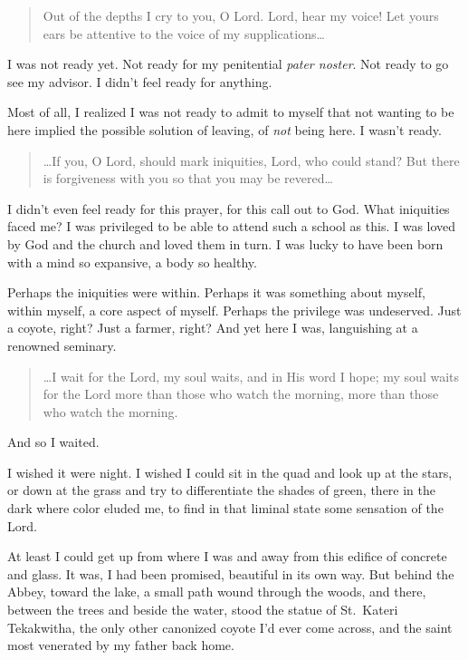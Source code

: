 \begin{quote}
Out of the depths I cry to you, O Lord. Lord, hear my voice! Let yours ears be attentive to the voice of my supplications\ldots{}
\end{quote}

I was not ready yet. Not ready for my penitential \emph{pater noster}. Not ready to go see my advisor. I didn't feel ready for anything.

Most of all, I realized I was not ready to admit to myself that not wanting to be here implied the possible solution of leaving, of \emph{not} being here. I wasn't ready.

\begin{quote}
\ldots If you, O Lord, should mark iniquities, Lord, who could stand? But there is forgiveness with you so that you may be revered\ldots{}
\end{quote}

I didn't even feel ready for this prayer, for this call out to God. What iniquities faced me? I was privileged to be able to attend such a school as this. I was loved by God and the church and loved them in turn. I was lucky to have been born with a mind so expansive, a body so healthy.

Perhaps the iniquities were within. Perhaps it was something about myself, within myself, a core aspect of myself. Perhaps the privilege was undeserved. Just a coyote, right? Just a farmer, right? And yet here I was, languishing at a renowned seminary.

\begin{quote}
\ldots I wait for the Lord, my soul waits, and in His word I hope; my soul waits for the Lord more than those who watch the morning, more than those who watch the morning.
\end{quote}

And so I waited.

I wished it were night. I wished I could sit in the quad and look up at the stars, or down at the grass and try to differentiate the shades of green, there in the dark where color eluded me, to find in that liminal state some sensation of the Lord.

At least I could get up from where I was and away from this edifice of concrete and glass. It was, I had been promised, beautiful in its own way. But behind the Abbey, toward the lake, a small path wound through the woods, and there, between the trees and beside the water, stood the statue of St.~Kateri Tekakwitha, the only other canonized coyote I'd ever come across, and the saint most venerated by my father back home.

